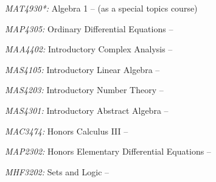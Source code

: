 \documentclass[11pt]{article}
\begin{document}
\textsl{MAT4930*\textsuperscript{\textdagger}:} Algebra 1 -- (as a special topics course)

\textsl{MAP4305:} Ordinary Differential Equations --

\textsl{MAA4402:} Introductory Complex Analysis --

\textsl{MAS4105:} Introductory Linear Algebra --

\textsl{MAS4203:} Introductory Number Theory --

\textsl{MAS4301:} Introductory Abstract Algebra --

\textsl{MAC3474:} Honors Calculus III --

\textsl{MAP2302:} Honors Elementary Differential Equations --

\textsl{MHF3202:} Sets and Logic --
\end{document}
